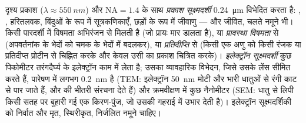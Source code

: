 \begin{proposition}[प्रकाश और इलेक्ट्रॉन सूक्ष्मदर्शी]\label{prop:b1:cell-unit-of-life:microscopes}
दृश्य प्रकाश ($\lambda \approx \qty{550}{nm}$) और $\mathrm{NA} = 1.4$
के साथ \emph{प्रकाश सूक्ष्मदर्शी}
\qty{0.24}{\micro m} विभेदित करता है: , , हरितलवक,
बिंदुओं के रूप में सूत्रकणिकाएँ, छड़ों के रूप में जीवाणु --- और जीवित,
चलते नमूने भी। किसी पारदर्शी  में विषमता अभिरंजन से मिलती है (जो
प्रायः मार डालता है), या \emph{प्रावस्था विषमता} से (अपवर्तनांक के भेदों
को चमक के भेदों में बदलकर), या \emph{प्रतिदीप्ति} से (किसी एक अणु को
किसी रंजक या प्रतिदीप्त प्रोटीन से चिह्नित करके और केवल उसी का प्रकाश
चित्रित करके)। \emph{इलेक्ट्रॉन सूक्ष्मदर्शी} कुछ पिकोमीटर तरंगदैर्घ्य के इलेक्ट्रॉन काम में लेता है; उसका
व्यावहारिक विभेदन, जिसे उसके लेंस सीमित करते हैं, पारेषण में लगभग
\qty{0.2}{nm} है (TEM: इलेक्ट्रॉन \qty{50}{nm} मोटी और भारी धातुओं से
रंगी काट से पार जाते हैं, और  की भीतरी संरचना देते हैं) और
क्रमवीक्षण में कुछ नैनोमीटर (SEM: धातु से लिपी किसी सतह पर बुहारी गई एक
किरण-पुंज, जो उसकी गहराई में उभार देती है)। इलेक्ट्रॉन सूक्ष्मदर्शिकी को
निर्वात और मृत, स्थिरीकृत, निर्जलित नमूने चाहिए।
\end{proposition}

